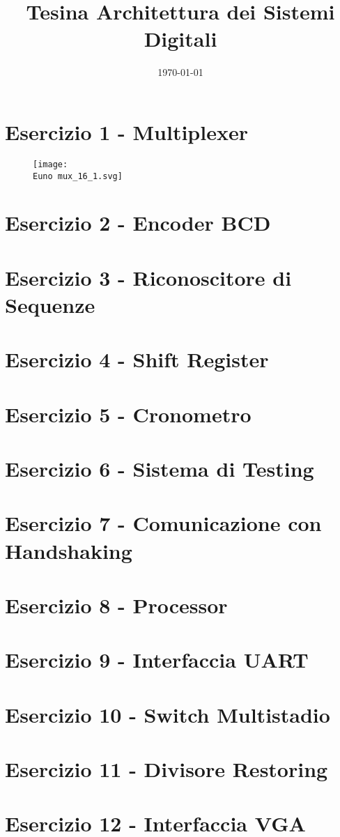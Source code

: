 \documentclass[a4paper]{article}
\def \Euno {Allegati/Esercizio1/}
\begin{document}
\title{Tesina Architettura dei Sistemi Digitali}
\date{\today}
\tableofcontents
\newpage
\section{Esercizio 1 - Multiplexer}

\begin{figure}
    \centering
    \texttt{[image: \\Euno mux\_16\_1.svg]}
\end{figure}

\newpage
\section{Esercizio 2 - Encoder BCD}
\newpage
\section{Esercizio 3 - Riconoscitore di Sequenze}
\newpage
\section{Esercizio 4 - Shift Register}
\newpage
\section{Esercizio 5 - Cronometro}
\newpage
\section{Esercizio 6 - Sistema di Testing}
\newpage
\section{Esercizio 7 - Comunicazione con Handshaking}
\newpage
\section{Esercizio 8 - Processor}
\newpage
\section{Esercizio 9 - Interfaccia UART}
\newpage
\section{Esercizio 10 - Switch Multistadio}
\newpage
\section{Esercizio 11 - Divisore Restoring}
\newpage
\section{Esercizio 12 - Interfaccia VGA}
\end{document}

